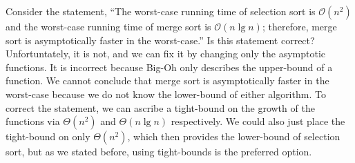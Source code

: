 \example Consider the statement, ``The worst-case running time of selection sort is $\mathcal{O}(n^2)$ and the worst-case running time of merge sort is $\mathcal{O}(n\lg{n})$; therefore, merge sort is asymptotically faster in the worst-case.'' Is this statement correct? Unfortuntately, it is not, and we can fix it by changing only the asymptotic functions. It is incorrect because Big-Oh only describes the upper-bound of a function. We cannot conclude that merge sort is asymptotically faster in the worst-case because we do not know the lower-bound of either algorithm. To correct the statement, we can ascribe a tight-bound on the growth of the functions via $\Theta(n^2)$ and $\Theta(n\lg{n})$ respectively. We could also just place the tight-bound on only $\Theta(n^2)$, which then provides the lower-bound of selection sort, but as we stated before, using tight-bounds is the preferred option.
